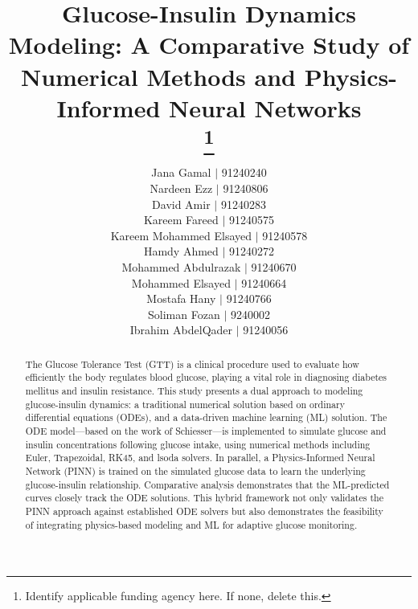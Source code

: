 \documentclass[conference]{IEEEtran}
\begin{document}
\title{Glucose-Insulin Dynamics Modeling: A Comparative Study of Numerical Methods and Physics-Informed Neural Networks\\

\thanks{Identify applicable funding agency here. If none, delete this.}
}

\author{
  \begin{minipage}{0.9\textwidth}
    \centering
    Jana Gamal $|$ 91240240\\
    Nardeen Ezz $|$ 91240806\\
    David Amir $|$ 91240283\\
    Kareem Fareed $|$ 91240575\\
    Kareem Mohammed Elsayed $|$ 91240578\\
    Hamdy Ahmed $|$ 91240272\\
    Mohammed Abdulrazak $|$ 91240670\\
    Mohammed Elsayed $|$ 91240664\\
    Mostafa Hany $|$ 91240766\\
    Soliman Fozan $|$ 9240002\\
    Ibrahim AbdelQader $|$ 91240056
  \end{minipage}
}

\maketitle 

\begin{abstract}
The Glucose Tolerance Test (GTT) is a clinical procedure used to evaluate how efficiently the body regulates blood glucose, playing a vital role in diagnosing diabetes mellitus and insulin resistance. This study presents a dual approach to modeling glucose-insulin dynamics: a traditional numerical solution based on ordinary differential equations (ODEs), and a data-driven machine learning (ML) solution. The ODE model—based on the work of Schiesser—is implemented to simulate glucose and insulin concentrations following glucose intake, using numerical methods including Euler, Trapezoidal, RK45, and lsoda solvers. In parallel, a Physics-Informed Neural Network (PINN) is trained on the simulated glucose data to learn the underlying glucose-insulin relationship. Comparative analysis demonstrates that the ML-predicted curves closely track the ODE solutions. This hybrid framework not only validates the PINN approach against established ODE solvers but also demonstrates the feasibility of integrating physics-based modeling and ML for adaptive glucose monitoring.
\end{abstract}
\end{document}
